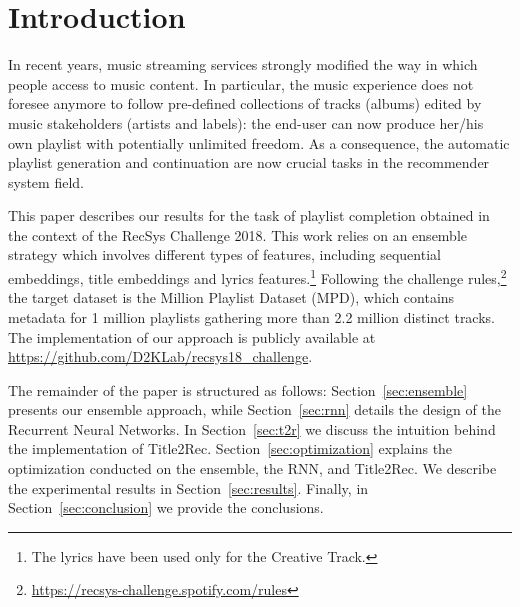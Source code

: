 \section{Introduction}
\label{sec:introduction}
In recent years, music streaming services strongly modified the way in which people access to music content. In particular, the music experience does not foresee anymore to follow pre-defined collections of tracks (albums) edited by music stakeholders (artists and labels): the end-user can now produce her/his own playlist with potentially unlimited freedom. As a consequence, the automatic playlist generation and continuation are now crucial tasks in the recommender system field.

This paper describes our results for the task of playlist completion obtained in the context of the RecSys Challenge 2018. This work relies on an ensemble strategy which involves different types of features, including sequential embeddings, title embeddings and lyrics features.\footnote{The lyrics have been used only for the Creative Track.} Following the challenge rules,\footnote{\url{https://recsys-challenge.spotify.com/rules}} the target dataset is the Million Playlist Dataset (MPD), which contains metadata for 1 million playlists gathering more than 2.2 million distinct tracks. The implementation of our approach is publicly available at \url{https://github.com/D2KLab/recsys18_challenge}.

The remainder of the paper is structured as follows: Section~\ref{sec:ensemble} presents our ensemble approach, while Section~\ref{sec:rnn} details the design of the Recurrent Neural Networks. In Section~\ref{sec:t2r} we discuss the intuition behind the implementation of Title2Rec. Section~\ref{sec:optimization} explains the optimization conducted on the ensemble, the RNN, and Title2Rec. We describe the experimental results in Section~\ref{sec:results}. Finally, in Section~\ref{sec:conclusion} we provide the conclusions.